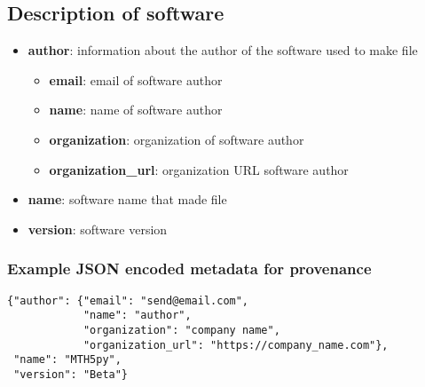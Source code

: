 \documentclass{article}
\newcommand{\attr}[1]{\textbf{#1}}
\begin{document}
\subsection{Description of \textbf{software}} 

\begin{itemize}
	\item \attr{author}: information about the author of the software used to make file
	\setlength{\itemsep}{.05em}
	\begin{itemize}
		\setlength{\itemsep}{.05em}
		\item \attr{email}: email of software author
		\item \attr{name}: name of software author
		\item \attr{organization}: organization of software author
		\item \attr{organization\_url}: organization URL software author
	\end{itemize}
	\item \attr{name}: software name that made file
	\item \attr{version}: software version 
\end{itemize}

\subsubsection{Example JSON encoded metadata for \textbf{provenance}}
\begin{verbatim}
{"author": {"email": "send@email.com",
            "name": "author",
            "organization": "company name",
            "organization_url": "https://company_name.com"},
 "name": "MTH5py",
 "version": "Beta"}
\end{verbatim}
\end{document}
